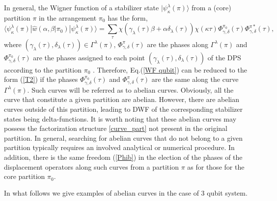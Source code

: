 \documentclass{article}
\begin{document}
In general, the Wigner function of a stabilizer state $|\psi _{\kappa
}^{\lambda }(\pi )\rangle $ from a (core) partition $\pi $ in the
arrangement $\pi _{0}$ has the form, 
\begin{equation}
\langle \psi _{\kappa }^{\lambda }(\pi )|\hat{w}\left( \alpha ,\beta |\pi
_{0}\right) |\psi _{\kappa }^{\lambda }(\pi )\rangle =\sum_{\tau }\chi
\left( \gamma _{\lambda }\left( \tau \right) \beta +\alpha \delta _{\lambda
}(\tau )\right) \chi (\kappa \tau )\Phi _{\gamma ,\delta }^{\pi _{0}}\left(
\tau \right) \Phi _{\gamma ,\delta }^{\pi \ast }\left( \tau \right) ,\quad
\label{WF qubit}
\end{equation}%
where $\left( \gamma _{\lambda }\left( \tau \right) ,\delta _{\lambda }(\tau
)\right) \in \Gamma ^{\lambda }(\pi )$, $\Phi _{\gamma ,\delta }^{\pi
}\left( \tau \right) $ are the phases along $\Gamma ^{\lambda }(\pi )$ and $%
\Phi _{\gamma ,\delta }^{\pi _{0}}\left( \tau \right) $ are the phases
assigned to each point $\left( \gamma _{\lambda }\left( \tau \right) ,\delta
_{\lambda }(\tau )\right) $ of the DPS according to the partition $\pi _{0}$%
. Therefore, Eq.(\ref{WF qubit}) can be reduced to the form (\ref{T2}) if
the phases $\Phi _{\gamma ,\delta }^{\pi _{0}}\left( \tau \right) $ and $%
\Phi _{\gamma ,\delta }^{\pi }\left( \tau \right) $ are the same along the
curve $\Gamma ^{\lambda }(\pi )$. Such curves will be referred as to abelian
curves. Obviously, all the curve that constitute a given partition are
abelian. However, there are abelian curves outside of this partition,
leading to DWF of the corresponding stabilizer states being delta-functions.
It is worth noting that these abelian curves may possess the factorization
structure \ref{curve_part} not present in the original partition. In
general, searching for abelian curves that do not belong to a given
partition typically requires an involved analytical or numerical procedure.
In addition, there is the same freedom (\ref{Phib}) in the election of the
phases of the displacement operators along such curves from a partition $\pi 
$ as for those for the core partition $\pi _{0}$.

In what follows we give examples of abelian curves in the case of 3 qubit
system.
\end{document}
